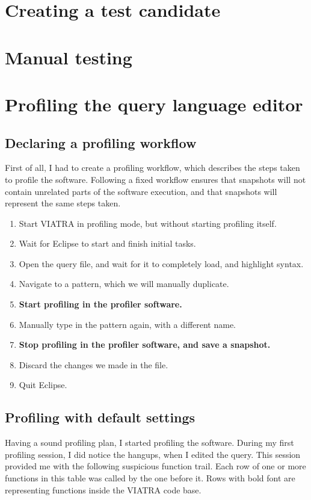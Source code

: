 \documentclass[11pt,a4paper,oneside]{report}
\begin{document}
\section{Creating a test candidate}

\section{Manual testing}

\section{Profiling the query language editor}
\subsection{Declaring a profiling workflow}
First of all, I had to create a profiling workflow, which describes the steps
taken to profile the software. Following a fixed workflow ensures that snapshots
will not contain unrelated parts of the software execution, and that snapshots
will represent the same steps taken.

\begin{enumerate}
    \item{Start VIATRA in profiling mode, but without starting profiling itself.}
    \item{Wait for Eclipse to start and finish initial tasks.}
    \item{Open the query file, and wait for it to completely load, and highlight syntax.}
    \item{Navigate to a pattern, which we will manually duplicate.}
    \item{\textbf{Start profiling in the profiler software.}}
    \item{Manually type in the pattern again, with a different name.}
    \item{\textbf{Stop profiling in the profiler software, and save a snapshot.}}
    \item{Discard the changes we made in the file.}
    \item{Quit Eclipse.}
\end{enumerate}

\subsection{Profiling with default settings}
Having a sound profiling plan, I started profiling the software. During my
first profiling session, I did notice the hangups, when I edited the query. This
session provided me with the following suspicious function trail. Each row of
one or more functions in this table was called by the one before it. Rows with
bold font are representing functions inside the VIATRA code base.
\end{document}

